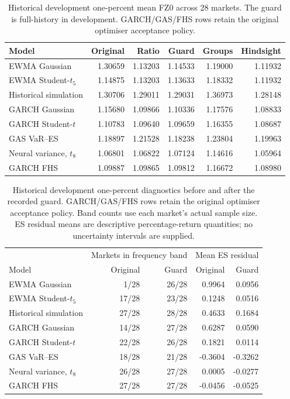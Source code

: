 \begin{table}[!htbp]
\centering\small
\caption[Historical development one-percent FZ0]{Historical development one-percent mean FZ0 across 28 markets. The guard is full-history in development. GARCH/GAS/FHS rows retain the original optimiser acceptance policy.}
\begin{tabular}{lrrrrr}
\toprule
Model & Original & Ratio & Guard & Groups & Hindsight \\
\midrule
EWMA Gaussian & 1.30659 & 1.13203 & 1.14533 & 1.19000 & 1.11932 \\
EWMA Student-$t_5$ & 1.14875 & 1.13203 & 1.13633 & 1.18332 & 1.11932 \\
Historical simulation & 1.30706 & 1.29011 & 1.29031 & 1.36973 & 1.28148 \\
GARCH Gaussian & 1.15680 & 1.09866 & 1.10336 & 1.17576 & 1.08833 \\
GARCH Student-$t$ & 1.10783 & 1.09640 & 1.09659 & 1.16355 & 1.08687 \\
GAS VaR--ES & 1.18897 & 1.21528 & 1.18238 & 1.23804 & 1.19963 \\
Neural variance, $t_8$ & 1.06801 & 1.06822 & 1.07124 & 1.14616 & 1.05964 \\
GARCH FHS & 1.09887 & 1.09865 & 1.09812 & 1.16672 & 1.08980 \\
\bottomrule
\end{tabular}
\end{table}
\begin{table}[!htbp]
\centering\small
\caption[Historical development one-percent diagnostics]{Historical development one-percent diagnostics before and after the recorded guard. GARCH/GAS/FHS rows retain the original optimiser acceptance policy. Band counts use each market's actual sample size. ES residual means are descriptive percentage-return quantities; no uncertainty intervals are supplied.}
\begin{tabular}{lrrrr}
\toprule
 & \multicolumn{2}{c}{Markets in frequency band} & \multicolumn{2}{c}{Mean ES residual} \\
Model & Original & Guard & Original & Guard \\
\midrule
EWMA Gaussian & 1/28 & 26/28 & 0.9964 & 0.0956 \\
EWMA Student-$t_5$ & 17/28 & 23/28 & 0.1248 & 0.0516 \\
Historical simulation & 27/28 & 28/28 & 0.4633 & 0.1684 \\
GARCH Gaussian & 14/28 & 27/28 & 0.6287 & 0.0590 \\
GARCH Student-$t$ & 22/28 & 26/28 & 0.1821 & 0.0114 \\
GAS VaR--ES & 18/28 & 21/28 & -0.3604 & -0.3262 \\
Neural variance, $t_8$ & 26/28 & 27/28 & 0.0005 & -0.0277 \\
GARCH FHS & 27/28 & 27/28 & -0.0456 & -0.0525 \\
\bottomrule
\end{tabular}
\end{table}
\FloatBarrier
\clearpage
